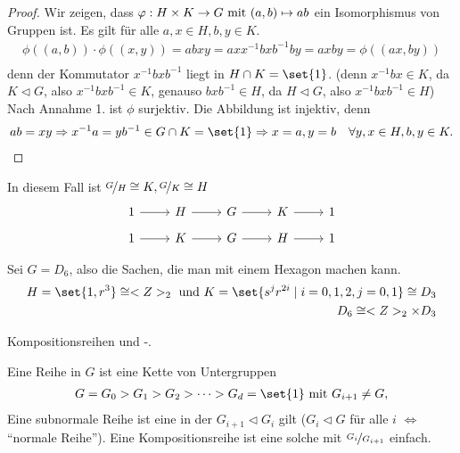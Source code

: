 \begin{proof}
	Wir zeigen, dass $\phi: H \times K \to G \mit (a,b) \mapsto ab$ ein Isomorphismus von Gruppen ist. Es gilt für alle $a,x \in H, b,y \in K$.
	\begin{align*}
		\phi((a,b))\cdot \phi((x,y)) = abxy = axx^{-1}bxb^{-1}by = axby = \phi((ax,by))\\
	\end{align*}
	denn der Kommutator $x^{-1}bxb^{-1}$ liegt in $H \cap K = \set{1}$. (denn $x^{-1}bx \in K$, da $K\lhd G$, also $x^{-1}bxb^{-1} \in K$, genauso $bxb^{-1} \in H$, da $H \lhd G$, also $x^{-1}bxb^{-1} \in H$) Nach Annahme 1. ist $\phi$ surjektiv. Die Abbildung ist injektiv, denn
	\begin{align*}
		ab = xy \implies x^{-1}a = yb^{-1} \in G \cap K = \set{1} \implies x=a, y=b \quad \forall y,x\in H,b,y \in K.
	\end{align*}
\end{proof}
\begin{*remark}
	In diesem Fall ist $\lnkset{G}{H} \cong K, \lnkset{G}{K} \cong H$
	\[
		\begin{tikzcd}
		1 \arrow[r] & H \arrow[r] & G \arrow[r] & K \arrow[r] & 1
		\end{tikzcd}
	\]
	\[
		\begin{tikzcd}
		1 \arrow[r] & K \arrow[r] & G \arrow[r] & H \arrow[r] & 1
		\end{tikzcd}
	\]
\end{*remark}
\begin{*example}
	Sei $G = D_6$, also die Sachen, die man mit einem Hexagon machen kann.
	\begin{align*}
		H = \set{1, r^3} \cong \Z_2 \und K = \set{s^jr^{2i} \mid i =0,1,2, j=0,1} \cong D_3\\
		D_6 \cong \Z_2 \times D_3
	\end{align*}
\end{*example}
Kompositionsreihen und -.
\begin{definition}
	Eine Reihe in $G$ ist eine Kette von Untergruppen
	\begin{align*}
		G = G_0 > G_1 > G_2 > \dots > G_d = \set{1} \mit G_{i+1} \neq G,
	\end{align*}
	Eine subnormale Reihe ist eine in der $G_{i+1} \lhd G_i$ gilt ($G_i \lhd G$ für alle $i$ $\Leftrightarrow$ ``normale Reihe''). Eine Kompositionsreihe ist eine solche mit $\lnkset{G_i}{G_{i+1}}$ einfach.
\end{definition}
